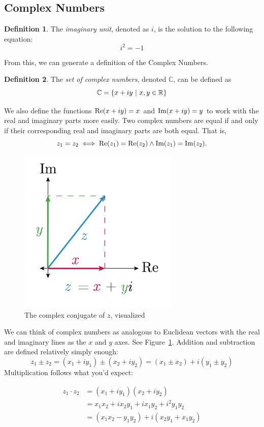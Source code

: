 \documentclass[a4paper]{article}
\numberwithin{equation}{subsection}
\theoremstyle{definition}
\newtheorem{definition}{Definition}[section]
\theoremstyle{remark}
\newenvironment{definitionSR}
{
\begin{siderules}
\begin{definition}
}
{
\end{definition}
\end{siderules}
}
\newcommand{\Reals}{\mathbb{R}}
\newcommand{\Complex}{\mathbb{C}}
\newcommand{\ReP}[1]{
	\mathrm{Re}\pqty{#1}
}
\newcommand{\ImP}[1]{
	\mathrm{Im}\pqty{#1}
}
\begin{document}
\subsection{Complex Numbers}
\label{ComplexNumbers}
\begin{definitionSR}
The \emph{imaginary unit}, denoted as $i$, is the solution to the following equation:
\[
i^2 = -1
\]
\end{definitionSR}
From this, we can generate a definition of the Complex Numbers.
\begin{definitionSR}
The \emph{set of complex numbers}, denoted $\Complex$, can be defined as
\[
\Complex = \Bqty{x+iy ~ | ~ x,y \in \Reals}
\]
\end{definitionSR}
We also define the functions $\ReP{x+iy}=x$ and $\ImP{x+iy}=y$ to work with the real and imaginary parts more easily.
Two complex numbers are equal if and only if their corresponding real and imaginary parts are both equal. That is,
\[
z_1 = z_2 \iff \ReP{z_1} = \ReP{z_2} \wedge \ImP{z_1} = \ImP{z_2}.
\]
\begin{figure}[h]
	\centering
	\caption{The complex conjugate of $z$, visualized}
	\label{fig:complexAddition}
	\includegraphics[width=3in]{complex_number_diagram-01}
\end{figure}
We can think of complex numbers as analogous to Euclidean vectors with
the real and imaginary lines as the $x$ and $y$ axes. See Figure~\ref{fig:complexAddition}. 
Addition and subtraction are defined relatively simply enough:
\[
z_1 \pm z_2 = (x_1 + i y_1) \pm (x_2 + i y_2) = (x_1 \pm x_2) + i (y_1 \pm y_2)
\]
Multiplication follows what you'd expect:

\begin{align*}
z_1 \cdot z_2 &= (x_1 + i y_1)(x_2+ i y_2)\\
&= x_1 x_2 + i x_2 y_1 + i x_1 y_2 + i^2 y_1 y_2\\
&= (x_1 x_2 - y_1 y_2) + i(x_2 y_1 + x_1 y_2)
\end{align*}
\end{document}
